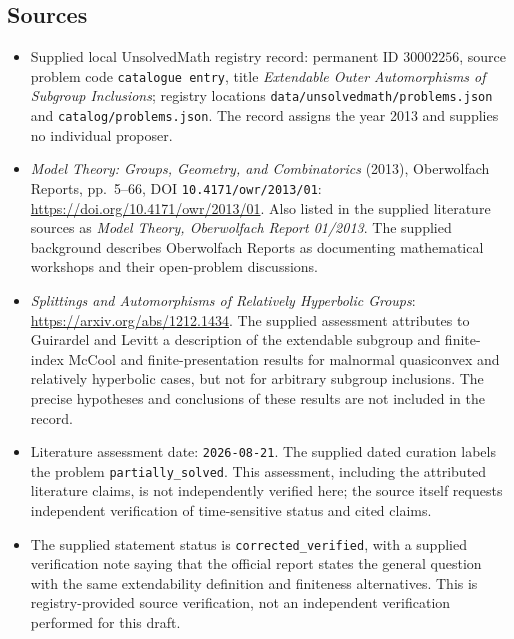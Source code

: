 \documentclass[11pt]{article}
\begin{document}
\subsection{Sources}
\begin{itemize}
\item Supplied local UnsolvedMath registry record: permanent ID \(30002256\), source problem code \texttt{catalogue entry}, title \emph{Extendable Outer Automorphisms of Subgroup Inclusions}; registry locations \texttt{data/unsolvedmath/problems.json} and \texttt{catalog/problems.json}. The record assigns the year 2013 and supplies no individual proposer.
\item \emph{Model Theory: Groups, Geometry, and Combinatorics} (2013), Oberwolfach Reports, pp.\ 5--66, DOI \texttt{10.4171/owr/2013/01}: \url{https://doi.org/10.4171/owr/2013/01}. Also listed in the supplied literature sources as \emph{Model Theory, Oberwolfach Report 01/2013}. The supplied background describes Oberwolfach Reports as documenting mathematical workshops and their open-problem discussions.
\item \emph{Splittings and Automorphisms of Relatively Hyperbolic Groups}: \url{https://arxiv.org/abs/1212.1434}. The supplied assessment attributes to Guirardel and Levitt a description of the extendable subgroup and finite-index McCool and finite-presentation results for malnormal quasiconvex and relatively hyperbolic cases, but not for arbitrary subgroup inclusions. The precise hypotheses and conclusions of these results are not included in the record.
\item Literature assessment date: \texttt{2026-08-21}. The supplied dated curation labels the problem \texttt{partially\_solved}. This assessment, including the attributed literature claims, is not independently verified here; the source itself requests independent verification of time-sensitive status and cited claims.
\item The supplied statement status is \texttt{corrected\_verified}, with a supplied verification note saying that the official report states the general question with the same extendability definition and finiteness alternatives. This is registry-provided source verification, not an independent verification performed for this draft.
\end{itemize}
\end{document}
